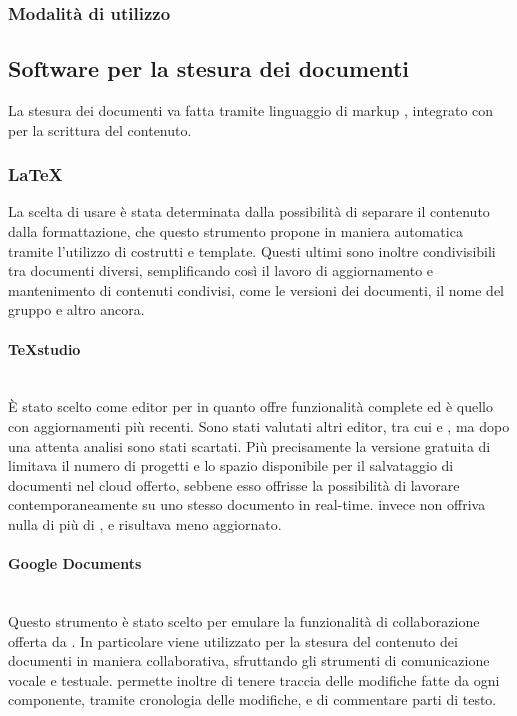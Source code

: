 \subsubsection{Modalità di utilizzo} \label{sec:procedure_teamwork}

\subsection{Software per la stesura dei documenti}
La stesura dei documenti va fatta tramite linguaggio di markup \glossario{\LaTeX{}}, integrato con  per la scrittura del contenuto. 

\subsubsection{\LaTeX}
La scelta di usare \glossario{\LaTeX{}} è stata determinata dalla possibilità di separare il contenuto dalla formattazione, che questo strumento propone in maniera automatica tramite l'utilizzo di costrutti e template. Questi ultimi sono inoltre condivisibili tra documenti diversi, semplificando così il lavoro di aggiornamento e mantenimento di contenuti condivisi, come le versioni dei documenti, il nome del gruppo e altro ancora.

\paragraph{TeXstudio}\mbox{}\\
\`{E} stato scelto  come editor per \glossario{\LaTeX{}} in quanto offre funzionalità complete ed è quello con aggiornamenti più recenti. Sono stati valutati altri editor, tra cui  e , ma dopo una attenta analisi sono stati scartati. Più precisamente la versione gratuita di  limitava il numero di progetti e lo spazio disponibile per il salvataggio di documenti nel cloud offerto, sebbene esso offrisse la possibilità di lavorare contemporaneamente su uno stesso documento in real-time.  invece non offriva nulla di più di , e risultava meno aggiornato.

\paragraph{Google Documents}\mbox{}\\
Questo strumento è stato scelto per emulare la funzionalità di collaborazione offerta da . In particolare viene utilizzato per la stesura del contenuto dei documenti in maniera collaborativa, sfruttando gli strumenti di comunicazione vocale e testuale.  permette inoltre di tenere traccia delle modifiche fatte da ogni componente, tramite cronologia delle modifiche, e di commentare parti di testo. 

